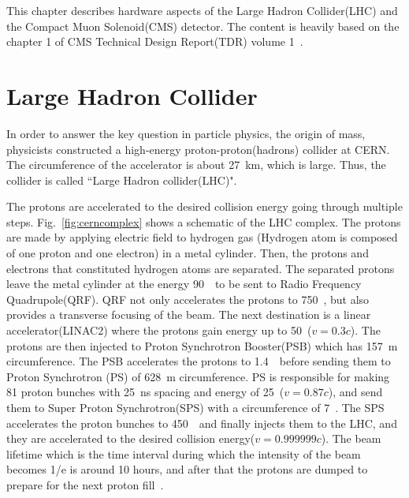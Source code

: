 This chapter describes hardware aspects of the Large Hadron Collider(LHC) 
and the Compact Muon Solenoid(CMS) detector. The content is heavily based on 
the chapter 1 of CMS Technical Design Report(TDR) volume 1~\cite{cmstdr1}.


\section{Large Hadron Collider} 


In order to answer the key question in particle physics, 
the origin of mass, physicists constructed a high-energy 
proton-proton(hadrons) collider at CERN. The circumference of the accelerator 
is about 27~km, which is large. Thus, the collider is called 
``Large Hadron collider(LHC)". 

The protons are accelerated to the desired collision energy 
going through multiple steps. 
Fig.~\ref{fig:cerncomplex} shows a schematic of the LHC complex. 
The protons are made by applying electric field to hydrogen gas
(Hydrogen atom is composed of one proton and one electron) 
in a metal cylinder. Then, the protons and electrons that constituted 
hydrogen atoms are separated. The separated protons leave 
the metal cylinder at the energy 90~\keV\ to be 
sent to Radio Frequency Quadrupole(QRF). QRF not only accelerates 
the protons to 750~\keV, but also provides a transverse focusing 
of the beam. The next destination is a linear accelerator(LINAC2) 
where the protons gain energy up to 50~\MeV($v=0.3c$).
The protons are then injected to Proton Synchrotron Booster(PSB) which has 
157~m circumference. The PSB accelerates the protons to 1.4~\GeV\
before sending them to Proton Synchrotron (PS) of 628~m circumference.
PS is responsible for making 81 proton bunches with 25~ns spacing 
and energy of 25~\GeV($v=0.87c$),  
and send them to Super Proton Synchrotron(SPS) with a circumference of 7~\km. 
The SPS accelerates the proton bunches to 450~\GeV\ and finally injects them 
to the LHC, and they are accelerated to the desired collision energy($v=0.999999c$). 
The beam lifetime which is the time interval during which the intensity of 
the beam becomes 1/e is around 10 hours, and after that 
the protons are dumped to prepare for the next proton fill~\cite{LHCbeamlifetime}. 

